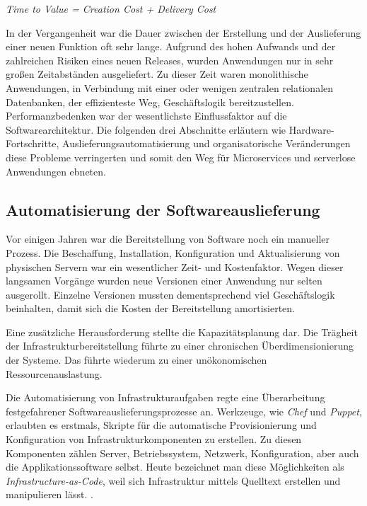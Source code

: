\begin{center}
\textit{Time to Value = Creation Cost + Delivery Cost}
\end{center}

In der Vergangenheit war die Dauer zwischen der Erstellung und der Auslieferung einer neuen Funktion oft sehr lange. Aufgrund des hohen Aufwands und der zahlreichen Risiken eines neuen Releases, wurden Anwendungen nur in sehr großen Zeitabständen ausgeliefert. Zu dieser Zeit waren monolithische Anwendungen, in Verbindung mit einer oder wenigen zentralen relationalen Datenbanken, der effizienteste Weg, Geschäftslogik bereitzustellen. Performanzbedenken war der wesentlichste Einflussfaktor auf die Softwarearchitektur. Die folgenden drei Abschnitte erläutern wie Hardware-Fortschritte, Auslieferungsautomatisierung und organisatorische Veränderungen diese Probleme verringerten und somit den Weg für Microservices und serverlose Anwendungen ebneten.

\subsection{Automatisierung der Softwareauslieferung}

Vor einigen Jahren war die Bereitstellung von Software noch ein manueller Prozess. Die Beschaffung, Installation, Konfiguration und Aktualisierung von physischen Servern war ein wesentlicher Zeit- und Kostenfaktor. Wegen dieser langsamen Vorgänge wurden neue Versionen einer Anwendung nur selten ausgerollt. Einzelne Versionen mussten dementsprechend viel Geschäftslogik beinhalten, damit sich die Kosten der Bereitstellung amortisierten.

Eine zusätzliche Herausforderung stellte die Kapazitätsplanung dar. Die Trägheit der Infrastrukturbereitstellung führte zu einer chronischen Überdimensionierung der Systeme. Das führte wiederum zu einer unökonomischen Ressourcenauslastung.

Die Automatisierung von Infrastrukturaufgaben regte eine Überarbeitung festgefahrener Softwareauslieferungsprozesse an. Werkzeuge, wie \textit{Chef} und \textit{Puppet}, erlaubten es erstmals, Skripte für die automatische Provisionierung und Konfiguration von Infrastrukturkomponenten zu erstellen. Zu diesen Komponenten zählen Server, Betriebssystem, Netzwerk, Konfiguration, aber auch die Applikationssoftware selbst. Heute bezeichnet man diese Möglichkeiten als \textit{Infrastructure-as-Code}, weil sich Infrastruktur mittels Quelltext erstellen und manipulieren lässt. \cite[135]{Httermann:2012:DD:2380958}.


